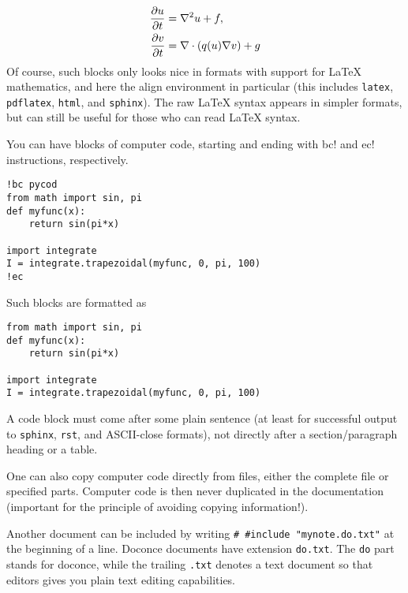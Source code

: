 \documentclass[%
oneside,                 %
final,                   %
10pt]{article}
\begin{document}
\begin{align}
{\partial u\over\partial t} &= \nabla^2 u + f, \label{myeq1}\\
{\partial v\over\partial t} &= \nabla\cdot(q(u)\nabla v) + g
\end{align}
Of course, such blocks only looks nice in formats with support
for {\LaTeX} mathematics, and here the align environment in particular
(this includes {\fontsize{10pt}{10pt}\Verb!latex!}, {\fontsize{10pt}{10pt}\Verb!pdflatex!}, {\fontsize{10pt}{10pt}\Verb!html!}, and {\fontsize{10pt}{10pt}\Verb!sphinx!}). The raw
{\LaTeX} syntax appears in simpler formats, but can still be useful
for those who can read {\LaTeX} syntax.

You can have blocks of computer code, starting and ending with
{\fontsize{10pt}{10pt}\Verb!!bc!} and {\fontsize{10pt}{10pt}\Verb!!ec!} instructions, respectively.

\begin{Verbatim}[fontsize=\fontsize{9pt}{9pt},tabsize=8,baselinestretch=0.85,
fontfamily=tt,xleftmargin=7mm]
!bc pycod
from math import sin, pi
def myfunc(x):
    return sin(pi*x)

import integrate
I = integrate.trapezoidal(myfunc, 0, pi, 100)
!ec
\end{Verbatim}
\noindent
Such blocks are formatted as

\begin{verbatim}
from math import sin, pi
def myfunc(x):
    return sin(pi*x)

import integrate
I = integrate.trapezoidal(myfunc, 0, pi, 100)
\end{verbatim}
\noindent
A code block must come after some plain sentence (at least for successful
output to {\fontsize{10pt}{10pt}\Verb!sphinx!}, {\fontsize{10pt}{10pt}\Verb!rst!}, and ASCII-close formats),
not directly after a section/paragraph heading or a table.


One can also copy computer code directly from files, either the
complete file or specified parts.  Computer code is then never
duplicated in the documentation (important for the principle of
avoiding copying information!).

Another document can be included by writing {\fontsize{10pt}{10pt}\Verb!# #include "mynote.do.txt"!}
at the beginning of a line.  Doconce documents have
extension {\fontsize{10pt}{10pt}\Verb!do.txt!}. The {\fontsize{10pt}{10pt}\Verb!do!} part stands for doconce, while the
trailing {\fontsize{10pt}{10pt}\Verb!.txt!} denotes a text document so that editors gives you
plain text editing capabilities.
\end{document}
